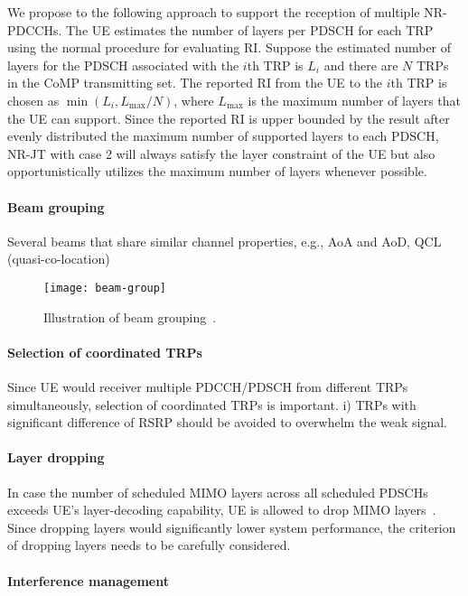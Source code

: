 \documentclass[a4paper,12pt]{article}%
\begin{document}
We propose to the following approach to support the reception of multiple NR-PDCCHs. The UE estimates the number of layers per PDSCH for each TRP using the normal procedure for evaluating RI. Suppose the estimated number of layers for the PDSCH associated with the $i$th TRP is $L_i$ and there are $N$ TRPs in the CoMP transmitting set. The reported RI from the UE to the $i$th TRP is chosen as $\min(L_i, L_{\max}/N)$, where $L_{\max}$ is the maximum number of layers that the UE can support. Since the reported RI is upper bounded by the result after evenly distributed the maximum number of supported layers to each PDSCH, NR-JT with case 2 will always satisfy the layer constraint of the UE but also opportunistically utilizes the maximum number of layers whenever possible.

\paragraph{Beam grouping}

Several beams that share similar channel properties, e.g., AoA  and AoD, QCL (quasi-co-location)

\begin{figure}[t]
        \centering
        \texttt{[image: beam-group]}
        \caption{Illustration of beam grouping~\cite{R1-1610891}.}\label{fig:beam-group}
\end{figure}

\paragraph{Selection of coordinated TRPs}

Since UE would receiver multiple PDCCH/PDSCH from different TRPs simultaneously, selection of coordinated TRPs is important. i) TRPs with significant difference of RSRP should be avoided to overwhelm the weak signal.

\paragraph{Layer dropping}

In case the number of scheduled MIMO layers across all scheduled PDSCHs exceeds UE's layer-decoding capability, UE is allowed to drop MIMO layers~\cite{R1-1710523}. Since dropping layers would significantly lower system performance, the criterion of dropping layers needs to be carefully considered.

 \paragraph{Interference management}
\end{document}
